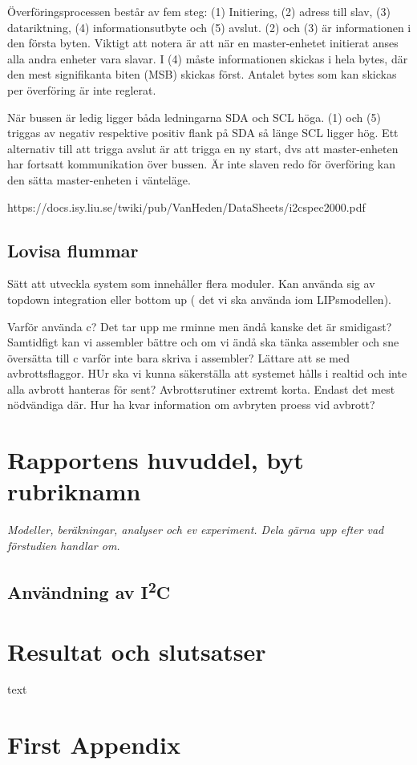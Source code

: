 \documentclass[11pt]{article}
\begin{document}
\begin{flushleft}
Överföringsprocessen består av fem steg: (1) Initiering, (2) adress till slav, (3) datariktning, (4) informationsutbyte och (5) avslut. (2) och (3) är informationen i den första byten. Viktigt att notera är att när en master-enhetet initierat anses alla andra enheter vara slavar. I (4) måste informationen skickas i hela bytes, där den mest signifikanta biten (MSB) skickas först. Antalet bytes som kan skickas per överföring är inte reglerat.

När bussen är ledig ligger båda ledningarna SDA och SCL höga. (1) och (5) triggas av negativ respektive positiv flank på SDA så länge SCL ligger hög. Ett alternativ till att trigga avslut är att trigga en ny start, dvs att master-enheten har fortsatt kommunikation över bussen. Är inte slaven redo för överföring kan den sätta master-enheten i vänteläge.

https://docs.isy.liu.se/twiki/pub/VanHeden/DataSheets/i2cspec2000.pdf


\subsection{Lovisa flummar}
Sätt att utveckla system som innehåller flera moduler.
Kan använda sig av topdown integration eller bottom up ( det vi ska använda iom LIPsmodellen).

Varför använda c? Det tar upp me rminne men ändå kanske det är smidigast? Samtidfigt kan vi assembler bättre och om vi ändå ska tänka assembler och sne översätta till c varför inte bara skriva i assembler? Lättare att se med avbrottsflaggor.
HUr ska vi kunna säkerställa att systemet hålls i realtid och inte alla avbrott hanteras för sent? Avbrottsrutiner extremt korta. Endast det mest nödvändiga där. Hur ha kvar information om avbryten proess vid avbrott?

\pagebreak

\section{Rapportens huvuddel, byt rubriknamn}
\textit{Modeller, beräkningar, analyser och ev experiment. Dela gärna upp efter vad förstudien handlar om.}

\subsection{Användning av I\textsuperscript{2}C}

\pagebreak

\section{Resultat och slutsatser}
text

\pagebreak
{}



\pagebreak
\appendix
\section{First Appendix}

\end{flushleft}
\end{document}
